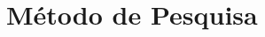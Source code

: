 \documentclass[
		12pt,				%
		openright,			%
		oneside,			%
		a4paper,			%
		chapter=TITLE,		%
		english,			%
		brazil				%
	]{abntex2}
\begin{document}








\chapter{Método de Pesquisa}
\end{document}
